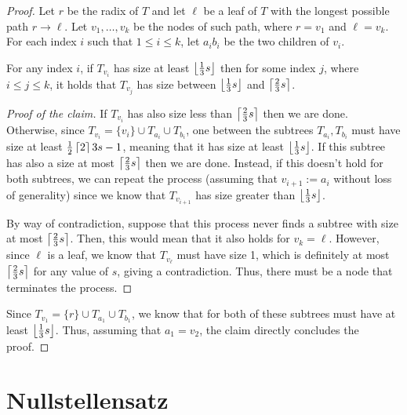 \begin{proof}
    Let $r$ be the radix of $T$ and let $\ell$ be a leaf of $T$ with the longest possible path $r \to \ell$. Let $v_1, \ldots, v_k$ be the nodes of such path, where $r = v_1$ and $\ell = v_k$. For each index $i$ such that $1 \leq i \leq k$, let $a_i b_i$ be the two children of $v_i$.

    \begin{claimlemma}
        For any index $i$, if $T_{v_i}$ has size at least $\left \lfloor \frac{1}{3} s \right \rfloor$ then for some index $j$, where $i \leq j \leq k$, it holds that $T_{v_j}$ has size between $\left \lfloor \frac{1}{3} s \right \rfloor$ and $\left \lceil \frac{2}{3} s \right \rceil$.
    \end{claimlemma}

    \begin{proof}[Proof of the claim]
        If $T_{v_i}$ has also size less than $\left \lceil \frac{2}{3} s \right \rceil$ then we are done. Otherwise, since $T_{v_i} = \{v_i\} \cup T_{a_i} \cup T_{b_i}$, one between the subtrees $T_{a_i}, T_{b_i}$ must have size at least $\frac{1}{2} \left \lceil 2 \right \rceil{3} s - 1$, meaning that it has size at least $\left \lfloor \frac{1}{3} s \right \rfloor$. If this subtree has also a size at most $\left \lceil \frac{2}{3} s \right \rceil$ then we are done. Instead, if this doesn't hold for both subtrees, we can repeat the process (assuming that $v_{i+1} := a_i$ without loss of generality) since we know that $T_{v_{i+1}}$ has size greater than $\left \lfloor \frac{1}{3} s \right \rfloor$.

        By way of contradiction, suppose that this process never finds a subtree with size at most $\left \lceil \frac{2}{3} s \right \rceil$. Then, this would mean that it also holds for $v_k = \ell$. However, since $\ell$ is a leaf, we know that $T_{v_\ell}$ must have size 1, which is definitely at most $\left \lceil \frac{2}{3} s \right \rceil$ for any value of $s$, giving a contradiction. Thus, there must be a node that terminates the process.

    \end{proof}
    
    Since $T_{v_1} = \{r\} \cup T_{a_1} \cup T_{b_1}$, we know that for both of these subtrees must have at least $\left \lfloor \frac{1}{3} s \right \rfloor$. Thus, assuming that $a_1 = v_{2}$, the claim directly concludes the proof.
    
\end{proof}

\section{Nullstellensatz}

